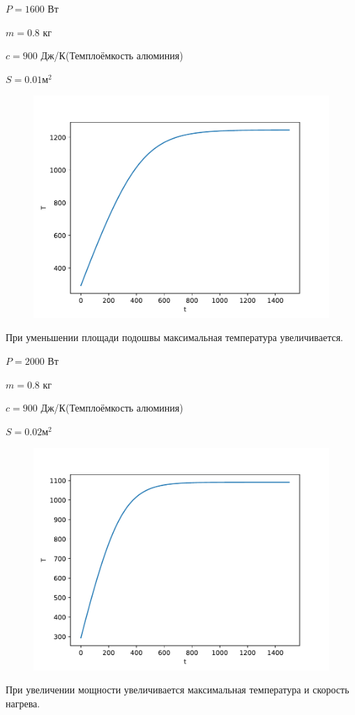 \documentclass[a4paper, 14pt]{extarticle}
\begin{document}
			$P = 1600$ Вт
			
			$m = 0.8$ кг
			
			$c = 900$ Дж/К(Темплоёмкость алюминия)
			
			$S = 0.01 \text{м}^2$
			
			\begin{figure}[H]
				\centering
				\includegraphics[width = \linewidth]{fig4.pdf}
				\caption[.] {}
			\end{figure}
			При уменьшении площади подошвы максимальная температура увеличивается.
			\pagebreak
			
			$P = 2000$ Вт
			
			$m = 0.8$ кг
			
			$c = 900$ Дж/К(Темплоёмкость алюминия)
			
			$S = 0.02 \text{м}^2$
			
			\begin{figure}[H]
				\centering
				\includegraphics[width = \linewidth]{fig10.pdf}
				\caption[.] {}
			\end{figure}
			При увеличении мощности увеличивается максимальная температура и скорость нагрева.
		\pagebreak
\end{document}
